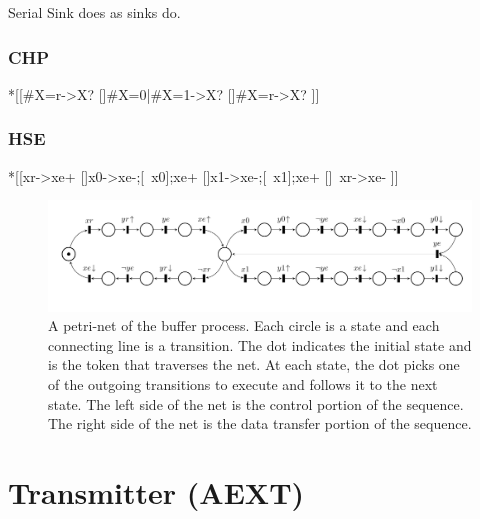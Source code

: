 \documentclass{article}
\begin{document}
Serial Sink does as sinks do.

\subsubsection*{CHP}

\begin{csp}
*[[#{X=r}->X?
  []#{X=0}|#{X=1}->X?
  []#{X=\neg r}->X?
 ]]
\end{csp}

\subsubsection*{HSE}

\begin{hse}
*[[xr->xe+
  []x0->xe-;[~x0];xe+
  []x1->xe-;[~x1];xe+
  []~xr->xe-
 ]]
\end{hse}

\begin{figure}
    \centering
    \includegraphics[width=.95\textwidth]{img/serial_protocol_petri_net.pdf}
    \caption{A petri-net of the buffer process.
Each circle is a state and each connecting line is a transition. The dot
indicates the initial state and is the token that traverses the net.
At each state, the dot picks one of the outgoing transitions to execute
and follows it to the next state. The left side of the net is the control
portion of the sequence. The right side of the net is the data transfer
portion of the sequence.}
    \label{fig:protocol_net}
\end{figure}

\section{Transmitter (AEXT)}
\end{document}
